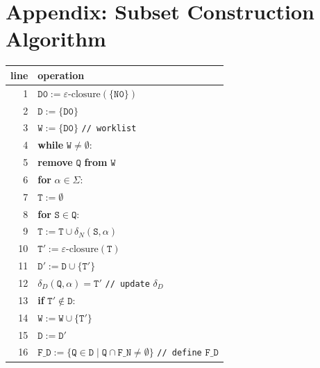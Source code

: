 \documentclass{article}
\begin{document}
\appendix
\section{Appendix: Subset Construction Algorithm}
\begin{center}
\begin{tabular}{r|l}
\textbf{line} & \textbf{operation} \\
\hline
1 & \(\mathtt{D0}:=\varepsilon\mbox{-closure}(\{\mathtt{N0}\})\) \\
2 & \(\mathtt{D}:=\{\mathtt{D0}\}\) \\
3 & \(\mathtt{W}:=\{\mathtt{D0}\}\) \quad\texttt{// worklist} \\
4 & \textbf{while} \(\mathtt{W}\ne\emptyset\): \\
5 & \quad\textbf{remove} \(\mathtt{Q}\) \textbf{from} \(\mathtt{W}\) \\
6 & \quad\textbf{for} \(\alpha\in\Sigma\): \\
7 & \qquad\(\mathtt{T}:=\emptyset\) \\
8 & \qquad\textbf{for} \(\mathtt{S}\in\mathtt{Q}\): \\
9 & \qquad\quad\(\mathtt{T}:=\mathtt{T}\cup\delta_N(\mathtt{S},\alpha)\) \\
10 & \qquad\(\mathtt{T}' := \varepsilon\mbox{-closure}(\mathtt{T})\) \\
11 & \qquad\(\mathtt{D}' := \mathtt{D}\cup\{\mathtt{T}'\}\) \\
12 & \qquad\(\delta_D(\mathtt{Q},\alpha)=\mathtt{T}'\) \quad\texttt{// update} \(\delta_D\) \\
13 & \qquad\textbf{if} \(\mathtt{T}'\notin\mathtt{D}\): \\
14 & \qquad\quad\(\mathtt{W}:=\mathtt{W}\cup\{\mathtt{T}'\}\) \\
15 & \qquad\(\mathtt{D}:=\mathtt{D}'\) \\
16 & \(\mathtt{F\_D}:=\{\mathtt{Q}\in\mathtt{D}\mid\mathtt{Q}\cap\mathtt{F\_N}\ne\emptyset\}\) \quad\texttt{// define} \(\mathtt{F\_D}\) \\
\end{tabular}
\end{center}
\end{document}
